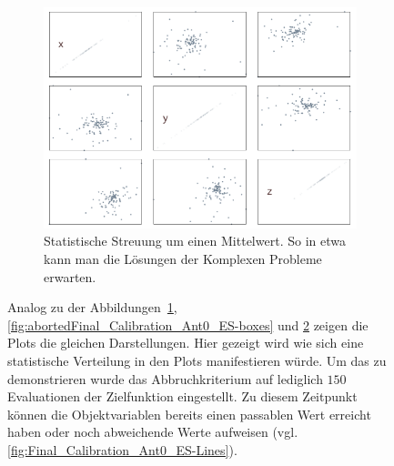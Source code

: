 \begin{figure}[!ht]
\begin{subfigure}[t]{0.45\textwidth}
             \label{fig:abortedFinal_Calibration_Ant0_ES-Lines}
     \end{subfigure}
%
\\
%
     \begin{subfigure}[t]{0.4\textwidth}
             \centering
             \includegraphics[width=\textwidth]{img/calibration/aborted_calibration_ant0-scatter.png}
             \caption{Statistische Streuung um einen Mittelwert. So in etwa kann man die Lösungen der Komplexen Probleme erwarten.}
             \label{fig:abortedFinal_Calibration_Ant0_ES-Scatter}
     \end{subfigure}
%
     \caption[Statistisch verteilte Ergebnisse der Kalibrierung mittels ES]{Analog zu der Abbildungen~\ref        {fig:abortedFinal_Calibration_Ant0_ES-Lines}, \ref{fig:abortedFinal_Calibration_Ant0_ES-boxes} und \ref{fig:abortedFinal_Calibration_Ant0_ES-Scatter} zeigen die Plots die gleichen Darstellungen. Hier gezeigt wird wie sich eine statistische Verteilung in den Plots manifestieren würde. Um das zu demonstrieren wurde das Abbruchkriterium auf lediglich $150$ Evaluationen der Zielfunktion eingestellt. Zu diesem Zeitpunkt können die Objektvariablen bereits einen passablen Wert erreicht haben oder noch abweichende Werte aufweisen (vgl. \ref{fig:Final_Calibration_Ant0_ES-Lines}).}
     \label{fig::abortedFinal_Calibration_Ant0_ES}
\end{figure}
%
